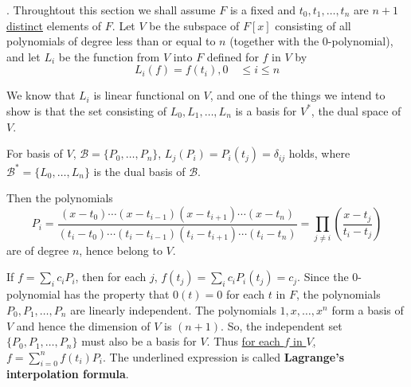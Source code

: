 \documentclass[8pt]{beamer}
\newcommand{\mc}[1]{\mathcal{#1}}
\newcommand{\tb}[1]{\textbf{#1}}
\begin{document}
\begin{frame}{.}
    Throughtout this section we shall assume $F$ is a fixed and $t_0, t_1, \dots, t_n$ are $n +1$ \underline{distinct} elements of $F$.
    Let $V$ be the subspace of $F[x]$ consisting of all polynomials of degree less than or equal to $n$ (together with the $0$-polynomial), and let $L_i$ be the function from $V$ into $F$ defined for $f$ in $V$ by
    \[L_i(f) = f(t_i), 0 \quad \leq i \leq n\]

    We know that $L_i$ is linear functional on $V$, and one of the things we intend to show is that the set consisting of $L_0, L_1, \dots, L_n$ is a basis for $V^\ast$, the dual space of $V$.

    For basis of $V$, $\mc{B} = \{P_0, \dots, P_n\}$,
    $L_j(P_i) = P_i(t_j) = \delta_{ij}$ holds, where $\mc{B}^\ast = \{L_0, \dots, L_n\}$ is the dual basis of $\mc{B}$.

    Then the polynomials
    \[
        P_i = \frac{(x-t_0)\cdots (x- t_{i-1})(x - t_{i+1})\cdots (x-t_n)}{(t_i - t_0)\cdots(t_i - t_{i-1})(t_i - t_{i+1})\cdots (t_i - t_n)} = \prod_{j\neq i} \left(\frac{x - t_j}{t_i - t_j}\right)
    \]
    are of degree $n$, hence belong to $V$.

    If $f = \sum_i c_i P_i$, then for each $j$,  $f(t_j) = \sum_i c_i P_i(t_j) = c_j$.
    Since the $0$-polynomial has the property that $0(t) =0$ for each $t$ in $F$, the polynomials $P_0, P_1, \dots, P_n$ are linearly independent.
    The polynomials $1, x, \dots, x^n$ form a basis of $V$ and hence the dimension of $V$ is $(n+1)$.
    So, the independent set $\{P_0, P_1,\dots, P_n\}$ must also be a basis for $V$.
    Thus \underline{for each $f$ in $V$, $f = \sum_{i=0}^n f(t_i) P_i$}.
    The underlined expression is called \tb{Lagrange's interpolation formula}.
\end{frame}
\end{document}
